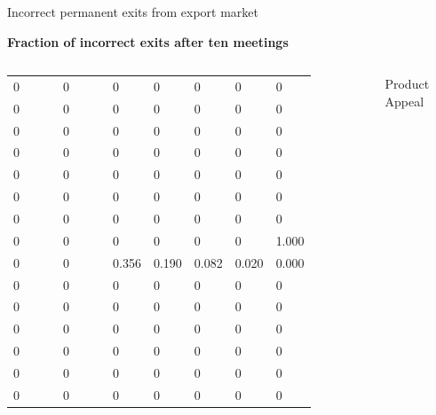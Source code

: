 \documentclass[notes=show]{beamer}
\begin{document}
\begin{frame}{Incorrect permanent exits from export market}

    \begin{center}
    \textbf{Fraction of incorrect exits after ten meetings}
    \end{center}

    \begin{columns}
            {\footnotesize 
            \begin{tabular}{lllllll}
                0\ \ \ \ \       & 0\ \ \ \ \      & 0     & 0     & 0     & 0     & 0     \\
                0\ \ \ \ \       & 0\ \ \ \ \      & 0     & 0     & 0     & 0     & 0     \\
                0\ \ \ \ \       & 0\ \ \ \ \      & 0     & 0     & 0     & 0     & 0     \\
                0\ \ \ \ \       & 0\ \ \ \ \      & 0     & 0     & 0     & 0     & 0     \\
                0\ \ \ \ \       & 0\ \ \ \ \      & 0     & 0     & 0     & 0     & 0     \\
                0\ \ \ \ \       & 0\ \ \ \ \      & 0     & 0     & 0     & 0     & 0     \\
                0\ \ \ \ \       & 0\ \ \ \ \      & 0     & 0     & 0     & 0     & 0     \\
                0\ \ \ \ \       & 0\ \ \ \ \      & 0     & 0     & 0     & 0     & 1.000 \\
                0\ \ \ \ \       & 0\ \ \ \ \      & 0.356 & 0.190 & 0.082 & 0.020 & 0.000 \\
                0\ \ \ \ \       & 0\ \ \ \ \      & 0     & 0     & 0     & 0     & 0     \\
                0\ \ \ \ \       & 0\ \ \ \ \      & 0     & 0     & 0     & 0     & 0     \\
                0\ \ \ \ \       & 0\ \ \ \ \      & 0     & 0     & 0     & 0     & 0     \\
                0\ \ \ \ \       & 0\ \ \ \ \      & 0     & 0     & 0     & 0     & 0     \\
                0\ \ \ \ \       & 0\ \ \ \ \      & 0     & 0     & 0     & 0     & 0     \\
                0\ \ \ \ \       & 0\ \ \ \ \      & 0     & 0     & 0     & 0     & 0     \\
            \end{tabular}
                }

            \begin{center}
            Product Appeal

            \end{center}
        \end{columns}

\end{frame}
\end{document}
